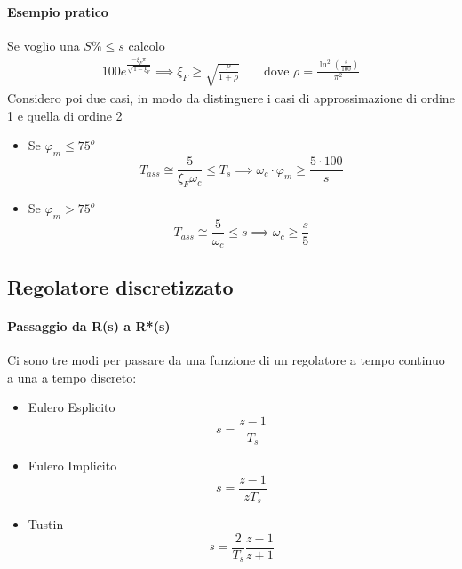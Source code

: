 \documentclass{article}
\begin{document}
	\paragraph{Esempio pratico}
	Se voglio una $S\% \leq  s$ calcolo
	\begin{align}
		100e^{\frac{-\xi_F\pi}{\sqrt{1-\xi_F}}} \implies \xi_F \geq \sqrt{\frac{\rho}{1+\rho}} &&
		\mbox{ dove }
		\rho = \frac{\ln^2(\frac{s}{100})}{\pi^2}
	\end{align}
	Considero poi due casi, in modo da distinguere i casi di approssimazione di ordine 1 e quella di ordine 2
	\begin{itemize}
		\item Se $\varphi_m \leq 75^o$
			\begin{equation}
				T_{ass} \cong \frac{5}{\xi_F \omega_c} \leq T_s \implies \omega_c\cdot\varphi_m \geq \frac{5 \cdot 100}{s}
			\end{equation}
		\item Se $\varphi_m > 75^o$
			\begin{equation}
				T_{ass} \cong \frac{5}{\omega_c} \leq s \implies \omega_c \geq \frac{s}{5}
			\end{equation}
	\end{itemize}

	\newpage
	\subsection{Regolatore discretizzato}
	\paragraph{Passaggio da R(s) a R*(s)}
	Ci sono tre modi per passare da una funzione di un regolatore a tempo continuo a una a tempo discreto:
	\begin{itemize}
		\item Eulero Esplicito
			\begin{equation}
				s = \frac{z-1}{T_s}
			\end{equation}
		\item Eulero Implicito
			\begin{equation}
				s = \frac{z-1}{zT_s}
			\end{equation}
		\item Tustin
			\begin{equation}
				s = \frac{2}{T_s}\frac{z-1}{z+1}
			\end{equation}
	\end{itemize}
\end{document}

